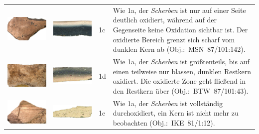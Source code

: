 \begin{footnotesize}
{\begin{longtable}{@{}m{}m{}m{}m{}@{}}
\includegraphics[width=.3\textwidth]{tbl/Tab_Fabrics/MSN87-101-142_5cm.jpg} & \includegraphics[width=.3\textwidth]{tbl/Tab_Fabrics/MSN87-101-142_2cm.jpg} & 1c & Wie 1a, der \textit{Scherben} ist nur auf einer Seite deutlich oxidiert, während auf der Gegenseite keine Oxidation sichtbar ist. Der oxidierte Bereich grenzt sich scharf vom dunklen Kern ab (Obj.:~MSN~87/101:142).\vspace{1em} \\
\includegraphics[width=.3\textwidth]{tbl/Tab_Fabrics/BTW87-101-43_5cm.jpg} & \includegraphics[width=.3\textwidth]{tbl/Tab_Fabrics/BTW87-101-43_2cm.jpg} & 1d & Wie 1a, der \textit{Scherben} ist größtenteils, bis auf einen teilweise nur blassen, dunklen Restkern oxidiert. Die oxidierte Zone geht fließend in den Restkern über (Obj.:~BTW~87/101:43). \\
\includegraphics[width=.3\textwidth]{tbl/Tab_Fabrics/IKE81-1-12_5cm.jpg} & \includegraphics[width=.3\textwidth]{tbl/Tab_Fabrics/IKE81-1-12_2cm.jpg} & 1e & Wie 1a, der \textit{Scherben} ist vollständig durchoxidiert, ein Kern ist nicht mehr zu beobachten (Obj.:~IKE~81/1:12). \\

\end{longtable}}
\end{footnotesize}
